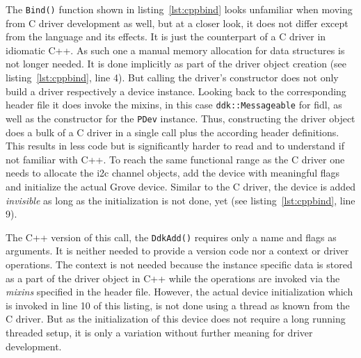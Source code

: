 %
The \texttt{Bind()} function shown in listing~\ref{lst:cppbind} looks unfamiliar when moving from C driver development as well, but at a closer look, it does not differ except from the language and its effects.
It is just the counterpart of a C driver in idiomatic C++.
As such one a manual memory allocation for data structures is not longer needed.
It is done implicitly as part of the driver object creation (see listing~\ref{lst:cppbind}, line 4).
But calling the driver's constructor does not only build a driver respectively a device instance.
Looking back to the corresponding header file it does invoke the mixins, in this case \texttt{ddk::Messageable} for \ac{fidl}, as well as the constructor for the \texttt{PDev} instance.
Thus, constructing the driver object does a bulk of a C driver in a single call plus the according header definitions.
This results in less code but is significantly harder to read and to understand if not familiar with C++.
To reach the same functional range as the C driver one needs to allocate the \ac{i2c} channel objects, add the device with meaningful flags and initialize the actual Grove device.
Similar to the C driver, the device is added \textit{invisible} as long as the initialization is not done, yet (see listing~\ref{lst:cppbind}, line 9).

The C++ version of this call, the \texttt{DdkAdd()} requires only a name and flags as arguments.
It is neither needed to provide a version code nor a context or driver operations.
The context is not needed because the instance specific data is stored as a part of the driver object in C++ while the operations are invoked via the \textit{mixins} specified in the header file.
However, the actual device initialization which is invoked in line 10 of this listing, is not done using a thread as known from the C driver.
But as the initialization of this device does not require a long running threaded setup, it is only a variation without further meaning for driver development.

